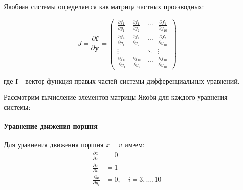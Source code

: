 Якобиан системы определяется как матрица частных производных:

\begin{equation}\label{eq:ch2/jacobian_matrix}
    J = \frac{\partial \mathbf{f}}{\partial \mathbf{y}} =
    \begin{pmatrix}
        \frac{\partial f_1}{\partial y_1}    & \frac{\partial f_1}{\partial y_2}    & \cdots & \frac{\partial f_1}{\partial y_{10}}    \\
        \frac{\partial f_2}{\partial y_1}    & \frac{\partial f_2}{\partial y_2}    & \cdots & \frac{\partial f_2}{\partial y_{10}}    \\
        \vdots                               & \vdots                               & \ddots & \vdots                                  \\
        \frac{\partial f_{10}}{\partial y_1} & \frac{\partial f_{10}}{\partial y_2} & \cdots & \frac{\partial f_{10}}{\partial y_{10}}
    \end{pmatrix}
\end{equation}

где $\mathbf{f}$ -- вектор-функция правых частей системы дифференциальных уравнений.


Рассмотрим вычисление элементов матрицы Якоби для каждого уравнения системы:

\paragraph{Уравнение движения поршня}
Для уравнения движения поршня $\dot{x} = v$ имеем:
\begin{equation}\label{eq:ch2/jacobian_motion}
    \begin{aligned}
        \frac{\partial \dot{x}}{\partial x}   & = 0                          \\
        \frac{\partial \dot{x}}{\partial v}   & = 1                          \\
        \frac{\partial \dot{x}}{\partial y_i} & = 0, \quad i = 3, \ldots, 10
    \end{aligned}
\end{equation}


